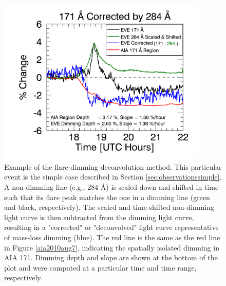 \begin{figure}[!h]
    \begin{center}
	    \includegraphics[width=100mm]{Images/DimmingCorrectionProcedure.png}
    \end{center}
    \caption[Flare-dimming deconvolution method example]{
        Example of the flare-dimming deconvolution method. This particular event is the simple case described in 
        Section \ref{sec:observationssimple}. A non-dimming line (e.g., 284 \AA) is scaled down and shifted in 
        time such that its flare peak matches the one in a dimming line (green and black, respectively). The scaled and 
        time-shifted non-dimming light curve is then subtracted from the dimming light curve, resulting in a "corrected" or
        "deconvolved" light curve representative of mass-loss dimming (blue). The red line is the same as the red line in 
        Figure \ref{aia2010aug7}, indicating the spatially isolated dimming in AIA 171. Dimming depth and slope are shown
        at the bottom of the plot and were computed at a particular time and time range, respectively. 
	}
    \label{flaredimmingdeconvolution}
\end{figure}

